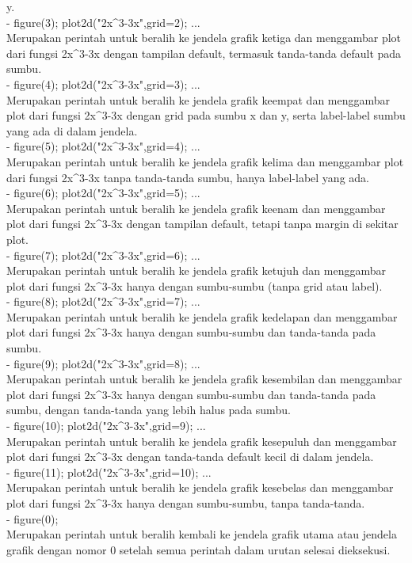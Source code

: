 \documentclass{article}
\begin{document}
\begin{eulernotebook}
\begin{eulercomment}
y.\\
- figure(3); plot2d("2x\textasciicircum{}3-3x",grid=2); ...\\
Merupakan perintah untuk beralih ke jendela grafik ketiga dan
menggambar plot dari fungsi 2x\textasciicircum{}3-3x dengan tampilan default, termasuk
tanda-tanda default pada sumbu.\\
- figure(4); plot2d("2x\textasciicircum{}3-3x",grid=3); ...\\
Merupakan perintah untuk beralih ke jendela grafik keempat dan
menggambar plot dari fungsi 2x\textasciicircum{}3-3x dengan grid pada sumbu x dan y,
serta label-label sumbu yang ada di dalam jendela.\\
- figure(5); plot2d("2x\textasciicircum{}3-3x",grid=4); ...\\
Merupakan perintah untuk beralih ke jendela grafik kelima dan
menggambar plot dari fungsi 2x\textasciicircum{}3-3x tanpa tanda-tanda sumbu, hanya
label-label yang ada.\\
- figure(6); plot2d("2x\textasciicircum{}3-3x",grid=5); ...\\
Merupakan perintah untuk beralih ke jendela grafik keenam dan
menggambar plot dari fungsi 2x\textasciicircum{}3-3x dengan tampilan default, tetapi
tanpa margin di sekitar plot.\\
- figure(7); plot2d("2x\textasciicircum{}3-3x",grid=6); ...\\
Merupakan perintah untuk beralih ke jendela grafik ketujuh dan
menggambar plot dari fungsi 2x\textasciicircum{}3-3x hanya dengan sumbu-sumbu (tanpa
grid atau label).\\
- figure(8); plot2d("2x\textasciicircum{}3-3x",grid=7); ...\\
Merupakan perintah untuk beralih ke jendela grafik kedelapan dan
menggambar plot dari fungsi 2x\textasciicircum{}3-3x hanya dengan sumbu-sumbu dan
tanda-tanda pada sumbu.\\
- figure(9); plot2d("2x\textasciicircum{}3-3x",grid=8); ...\\
Merupakan perintah untuk beralih ke jendela grafik kesembilan dan
menggambar plot dari fungsi 2x\textasciicircum{}3-3x hanya dengan sumbu-sumbu dan
tanda-tanda pada sumbu, dengan tanda-tanda yang lebih halus pada
sumbu.\\
- figure(10); plot2d("2x\textasciicircum{}3-3x",grid=9); ...\\
Merupakan perintah untuk beralih ke jendela grafik kesepuluh dan
menggambar plot dari fungsi 2x\textasciicircum{}3-3x dengan tanda-tanda default kecil
di dalam jendela.\\
- figure(11); plot2d("2x\textasciicircum{}3-3x",grid=10); ...\\
Merupakan perintah untuk beralih ke jendela grafik kesebelas dan
menggambar plot dari fungsi 2x\textasciicircum{}3-3x hanya dengan sumbu-sumbu, tanpa
tanda-tanda.\\
- figure(0);\\
Merupakan perintah untuk beralih kembali ke jendela grafik utama atau
jendela grafik dengan nomor 0 setelah semua perintah dalam urutan
selesai dieksekusi.


\end{eulercomment}
\end{eulernotebook}
\end{document}
